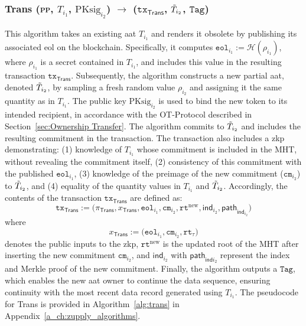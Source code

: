 \subsubsection{\textsf{Trans} (\textsc{pp}, $T_{i_1}$,  $\text{PKsig}_{i_2}$) $\rightarrow$ ($\texttt{tx}_{\textsf{Trans}}$, $\Tilde{T}_{i_2}$, $\texttt{Tag}$)}

This algorithm takes an existing \gls{aat} $T_{i_1}$ and renders it obsolete by publishing its associated \gls{eol} on the blockchain. Specifically, it computes $\texttt{eol}_{i_1} := \mathcal{H}(\rho_{i_1})$, where $\rho_{i_1}$ is a secret contained in $T_{i_1}$, and includes this value in the resulting transaction $\texttt{tx}_{\textsf{Trans}}$.
Subsequently, the algorithm constructs a new partial \gls{aat}, denoted $\Tilde{T}_{i_2}$, by sampling a fresh random value $\rho_{i_2}$ and assigning it the same quantity as in $T_{i_1}$. The public key $\text{PKsig}_{i_2}$ is used to bind the new token to its intended recipient, in accordance with the \textsf{OT-Protocol} described in Section~\ref{sec:Ownership Transfer}. The algorithm commits to $\Tilde{T}_{i_2}$ and includes the resulting commitment in the transaction.
The transaction also includes a \gls{zkp} demonstrating:
(1)  knowledge of $T_{i_1}$ whose commitment is included in the \textsf{MHT}, without revealing the commitment itself,
(2) consistency of this commitment with the published $\texttt{eol}_{i_1}$,
(3) knowledge of the preimage of the new commitment ($\texttt{cm}_{i_2}$) to $\Tilde{T}_{i_2}$, and
(4) equality of the quantity values in $T_{i_1}$ and $\Tilde{T}_{i_2}$.
Accordingly, the contents of the transaction $\texttt{tx}_{\textsf{Trans}}$ are defined as:
\[
\texttt{tx}_{\textsf{Trans}} := \big(\pi_{\textsf{Trans}}, x_{\textsf{Trans}}, \texttt{eol}_{i_1}, \texttt{cm}_{i_2}, \texttt{rt}^{\text{new}}, \mathsf{ind}_{i_2}, \mathsf{path}_{\mathsf{ind}_{i_2}} \big)
\]
where 
\[
x_\textsf{Trans} := \big(\texttt{eol}_{i_1}, \texttt{cm}_{i_2}, \texttt{rt}_\tau \big)
\]
denotes the public inputs to the \gls{zkp}, $\texttt{rt}^{\text{new}}$ is the updated root of the \textsf{MHT} after inserting the new commitment $\texttt{cm}_{i_2}$, and $\mathsf{ind}_{i_2}$ with $\mathsf{path}_{\mathsf{ind}{i_2}}$ represent the index and Merkle proof of the new commitment.
Finally, the algorithm outputs a $\texttt{Tag}$, which enables the new \gls{aat} owner to continue the data sequence, ensuring continuity with the most recent data record generated using $T_{i_1}$. The pseudocode for \textsf{Trans} is provided in Algorithm~\ref{alg:trans} in Appendix~\ref{a_ch:zupply_algorithms}.




